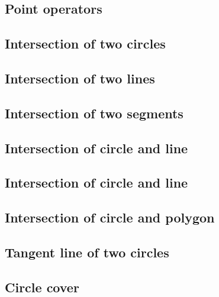 \documentclass[a4paper,10pt,twocolumn,oneside]{article}
\begin{document}
\subsection{Point operators}


\subsection{Intersection of two circles}


\subsection{Intersection of two lines}


\subsection{Intersection of two segments}


\subsection{Intersection of circle and line}


\subsection{Intersection of circle and line}


\subsection{Intersection of circle and polygon}


\subsection{Tangent line of two circles}


\subsection{Circle cover}

\end{document}
